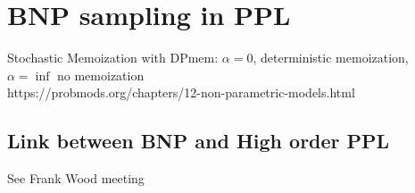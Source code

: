 
\chapter{BNP sampling in PPL}

Stochastic Memoization with DPmem: $\alpha = 0$, deterministic memoization, $\alpha = \inf$ no memoization\\
https://probmods.org/chapters/12-non-parametric-models.html


\section{Link between BNP and High order PPL}
See Frank Wood meeting
